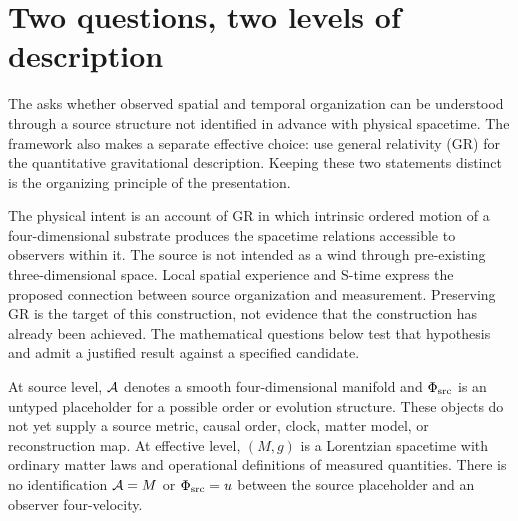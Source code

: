 \documentclass[11pt]{article}
\begin{document}

\section{Two questions, two levels of description}
The \TheoryProgram{} asks whether observed spatial and temporal organization can be understood through a source structure not identified in advance with physical spacetime. The framework also makes a separate effective choice: use general relativity (GR) for the quantitative gravitational description. Keeping these two statements distinct is the organizing principle of the presentation.

The physical intent is an account of GR in which intrinsic ordered motion of a four-dimensional substrate produces the spacetime relations accessible to observers within it. The source is not intended as a wind through pre-existing three-dimensional space. Local spatial experience and S-time express the proposed connection between source organization and measurement. Preserving GR is the target of this construction, not evidence that the construction has already been achieved. The mathematical questions below test that hypothesis and admit a justified result against a specified candidate.

At source level, $\mathcal A$ denotes a smooth four-dimensional manifold and $\Phi_{\mathrm{src}}$ is an untyped placeholder for a possible order or evolution structure. These objects do not yet supply a source metric, causal order, clock, matter model, or reconstruction map. At effective level, $(M,g)$ is a Lorentzian spacetime with ordinary matter laws and operational definitions of measured quantities. There is no identification $\mathcal A=M$ or $\Phi_{\mathrm{src}}=u$ between the source placeholder and an observer four-velocity.
\end{document}
